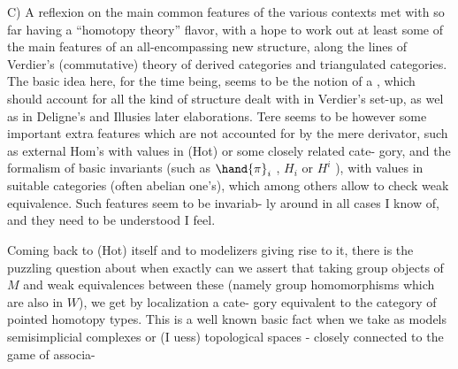 C)   A reflexion on the main common features of the various contexts
met with so far having a ``homotopy theory'' flavor,  with a hope to 
work out at least some of the main features of an all-encompassing new
structure,  along the lines of Verdier's (commutative) theory of derived
categories and triangulated categories.  The basic idea here,  for the time
being,  seems to be the notion of a \hand{\uline{\textcolor{black}{derivator}}},  which should account for
all the kind of structure dealt with in Verdier's set-up,  as wel as in
Deligne's and Illusies later elaborations.  Tere seems to be however some
important extra features which are not accounted for by the mere derivator,
such as external Hom's with values in (Hot) or some closely related cate-%
gory,  and the formalism of basic invariants (such as $\hand{\pi}_i$ , $H_i$ or $H^i$ ),
with values in suitable categories (often abelian one's),  which among
others allow to check weak equivalence.  Such features seem to be invariab-%
ly around in all cases I know of,  and they need to be understood I feel.

Coming back to (Hot) itself and to modelizers  giving rise to it,
there is the puzzling question about when exactly can we assert that
taking group objects of $M$ and weak equivalences between these (namely
group homomorphisms which are also in $W$),  we get by localization a cate-%
gory equivalent to the category  of pointed  homotopy types.  This is
a well known basic fact when we take as models semisimplicial complexes or
(I uess) topological spaces -  closely connected to the game of associa-%

